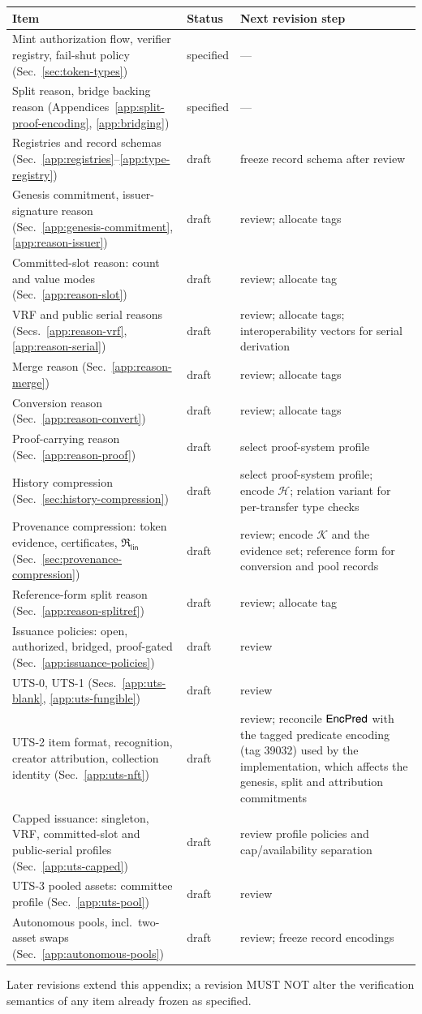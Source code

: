 \begin{longtable}{p{7.2cm}lp{4.6cm}}
\textbf{Item} & \textbf{Status} & \textbf{Next revision step} \\
\hline
\endhead
Mint authorization flow, verifier registry, fail-shut policy (Sec.~\ref{sec:token-types}) & specified & --- \\
Split reason, bridge backing reason (Appendices~\ref{app:split-proof-encoding}, \ref{app:bridging}) & specified & --- \\
Registries and record schemas (Sec.~\ref{app:registries}--\ref{app:type-registry}) & draft & freeze record schema after review \\
Genesis commitment, issuer-signature reason (Sec.~\ref{app:genesis-commitment}, \ref{app:reason-issuer}) & draft & review; allocate tags \\
Committed-slot reason: count and value modes (Sec.~\ref{app:reason-slot}) & draft & review; allocate tag \\
VRF and public serial reasons (Secs.~\ref{app:reason-vrf}, \ref{app:reason-serial}) & draft & review; allocate tags; interoperability vectors for serial derivation \\
Merge reason (Sec.~\ref{app:reason-merge}) & draft & review; allocate tags \\
Conversion reason (Sec.~\ref{app:reason-convert}) & draft & review; allocate tags \\
Proof-carrying reason (Sec.~\ref{app:reason-proof}) & draft & select proof-system profile \\
History compression (Sec.~\ref{sec:history-compression}) & draft & select proof-system profile; encode $\mathcal{H}$; relation variant for per-transfer type checks \\
Provenance compression: token evidence, certificates, $\mathfrak{R}_\mathsf{lin}$ (Sec.~\ref{sec:provenance-compression}) & draft & review; encode $\mathcal{K}$ and the evidence set; reference form for conversion and pool records \\
Reference-form split reason (Sec.~\ref{app:reason-splitref}) & draft & review; allocate tag \\
Issuance policies: open, authorized, bridged, proof-gated (Sec.~\ref{app:issuance-policies}) & draft & review \\
UTS-0, UTS-1 (Secs.~\ref{app:uts-blank}, \ref{app:uts-fungible}) & draft & review \\
UTS-2 item format, recognition, creator attribution, collection identity (Sec.~\ref{app:uts-nft}) & draft & review; reconcile $\mathsf{EncPred}$ with the tagged predicate encoding (tag 39032) used by the implementation, which affects the genesis, split and attribution commitments \\
Capped issuance: singleton, VRF, committed-slot and public-serial profiles (Sec.~\ref{app:uts-capped}) & draft & review profile policies and cap/availability separation \\
UTS-3 pooled assets: committee profile (Sec.~\ref{app:uts-pool}) & draft & review \\
Autonomous pools, incl.\ two-asset swaps (Sec.~\ref{app:autonomous-pools}) & draft & review; freeze record encodings \\
\end{longtable}

Later revisions extend this appendix; a revision MUST NOT alter the verification semantics of any item already frozen as specified.
